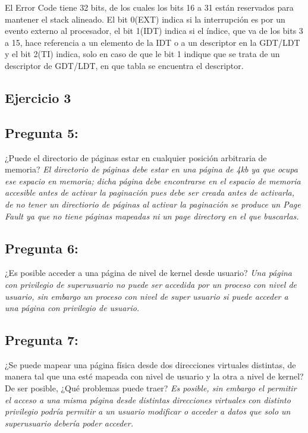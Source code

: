\documentclass[10pt, a4paper]{article}
\begin{document}
El Error Code tiene 32 bits, de los cuales los bits 16 a 31 están reservados para mantener el stack alineado. El bit 0(EXT) indica si la interrupción es por un evento externo al procesador, el bit 1(IDT) indica si el índice, que va de los bits 3 a 15, hace referencia a un elemento de la IDT o a un descriptor en la GDT/LDT y el bit 2(TI) indica, solo en caso de que le bit 1 indique que se trata de un descriptor de GDT/LDT, en que tabla se encuentra el descriptor.

\subsection{Ejercicio 3}
{\subsection{Pregunta 5:}} ¿Puede el directorio de páginas estar en cualquier posición arbitraria de memoria?\newline
\textit{
	El directorio de p\'aginas debe estar en una p\'agina de 4kb ya que ocupa ese espacio en memoria; dicha p\'agina debe encontrarse en el espacio de memoria accesible antes de activar la paginaci\'on pues debe ser creada antes de activarla, de no tener un directiorio de p\'aginas al activar la paginaci\'on se produce un Page Fault ya que no tiene p\'aginas mapeadas ni un page directory en el que buscarlas.
}
{\subsection{Pregunta 6:}} ¿Es posible acceder a una página de nivel de kernel desde usuario?\newline
\textit{
	Una p\'agina con privilegio de superusuario no puede ser accedida por un proceso con nivel de usuario, sin embargo un proceso con nivel de super usuario si puede acceder a una p\'agina con privilegio de usuario.
}

{\subsection{Pregunta 7:}} ¿Se puede mapear una página física desde dos direcciones virtuales
distintas, de manera tal que una esté mapeada con nivel de usuario y la otra a nivel de kernel? De ser posible, ¿Qué problemas puede traer?\newline
\textit{
	Es posible, sin embargo el permitir el acceso a una misma p\'agina desde distintas direcciones virtuales con distinto privilegio podr\'ia permitir a un usuario modificar o acceder a datos que solo un superusuario deber\'ia poder acceder.
}
\end{document}

